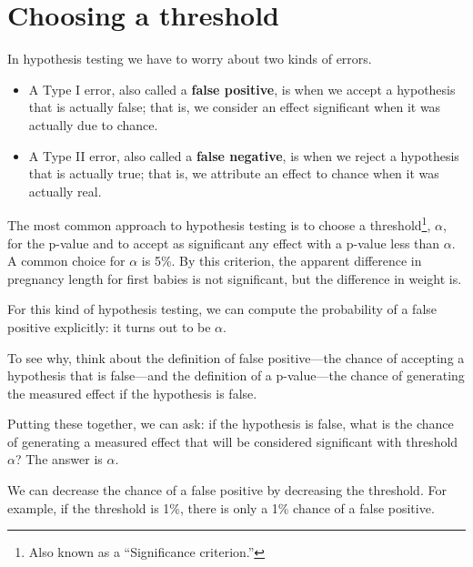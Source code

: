 \documentclass[12pt]{book}
\begin{document}
\section{Choosing a threshold}
\label{threshold}

In hypothesis testing we have to worry about two kinds of errors.


\begin{itemize}

\item A Type I error, also called a {\bf false positive}, is when we
  accept a hypothesis that is actually false; that is, we consider an
  effect significant when it was actually due to chance.

\item A Type II error, also called a {\bf false negative}, is when we
  reject a hypothesis that is actually true; that is, we attribute an
  effect to chance when it was actually real.

\end{itemize}

The most common approach to hypothesis testing is to choose a
threshold\footnote{Also known as a ``Significance criterion.''},
$\alpha$, for the p-value and to accept as significant any effect with
a p-value less than $\alpha$.  A common choice for $\alpha$ is 5\%.
By this criterion, the apparent difference in pregnancy length for
first babies is not significant, but the difference in weight is.



For this kind of hypothesis testing, we can compute the probability of
a false positive explicitly: it turns out to be $\alpha$.

To see why, think about the definition of false positive---the chance
of accepting a hypothesis that is false---and the definition of a
p-value---the chance of generating the measured effect if the
hypothesis is false.

Putting these together, we can ask: if the hypothesis is false,
what is the chance of generating a measured effect that will be
considered significant with threshold $\alpha$?  The answer is
$\alpha$.

We can decrease the chance of a false positive by decreasing the
threshold.  For example, if the threshold is 1\%, there is only a 1\%
chance of a false positive.
\end{document}
